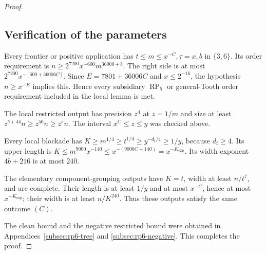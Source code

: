 \documentclass[11pt,a4paper]{article}
\theoremstyle{definition}
\theoremstyle{remark}
\numberwithin{equation}{section}
\begin{document}
\begin{proof}
\subsection{Verification of the parameters}\label{subsec:rp6-checks}
Every frontier or positive application has \(t\le\allowbreak m\le\allowbreak x^{-C},\allowbreak  \tau=x,\allowbreak  b\) in \(\{3,\allowbreak 6\}\). Its order requirement is \(n\ge\allowbreak 2^{7200} x^{-600} m^{36000+b}\). The right side is at most \(2^{7200} x^{-[600+36006C]}\). Since \(E=7801+36006C\) and \(x\le\allowbreak 2^{-16}\), the hypothesis \(n\ge\allowbreak x^{-E}\) implies this. Hence every subsidiary \(\operatorname{RP}_{5}\) or general-Tooth order requirement included in the local lemma is met.

The local restricted output has precision \(z^{4}\) at \(z=1/m\) and size at least \(z^{b+44}n\ge\allowbreak z^{50} n\ge\allowbreak z^{e} n\). The interval \(x^{C}\le\allowbreak z\le\allowbreak y\) was checked above.

Every local blockade has \(K\ge\allowbreak m^{1/4}\ge\allowbreak t^{1/4}\ge\allowbreak y^{-d_{t}/4}\ge\allowbreak 1/y\), because \(d_{t}\ge\allowbreak 4\). Its upper length is \(K\le\allowbreak m^{9000} x^{-140}\le\allowbreak x^{-(9000C+140)}=x^{-K_{\exp }}\). Its width exponent \(4b+216\) is at most \(240\).

The elementary component-grouping outputs have \(K=t\), width at least \(n/t^{7}\), and are complete. Their length is at least \(1/y\) and at most \(x^{-C}\), hence at most \(x^{-K_{\exp }}\); their width is at least \(n/K^{240}\). Thus these outputs satisfy the same outcome \((C)\).

The clean bound and the negative restricted bound were obtained in Appendices~\ref{subsec:rp6-tree} and \ref{subsec:rp6-negative}. This completes the proof.
\end{proof}
\end{document}
